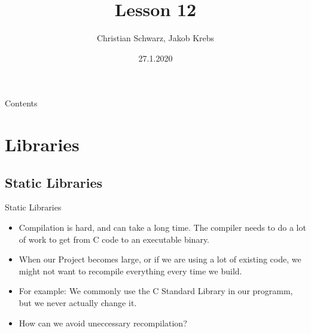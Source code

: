 \documentclass[10pt,graphics,aspectratio=169,table]{beamer}
\title{Lesson 12}
\author{Christian Schwarz, Jakob Krebs}
\date{27.1.2020}
\begin{document}
\maketitle

\begin{frame}{Contents}
    \tableofcontents
\end{frame}


\section{Libraries}

\subsection{Static Libraries}
\begin{frame}{Static Libraries}
    \begin{itemize}
        \item Compilation is hard, and can take a long time. 
            The compiler needs to do a lot of work to get 
            from C code to an executable binary.
        \item When our Project becomes large, or if we are using a lot of existing
            code, we might not want to recompile everything every time we build.
        \item For example: We commonly use the C Standard Library in our programm,
             but we never actually change it.
        \item How can we avoid uneccessary recompilation?
    \end{itemize}
    \end{frame}
\end{document}
